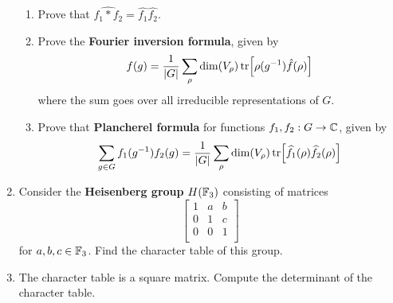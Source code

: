 \documentclass[../psets.tex]{subfiles}
\begin{document}
\begin{enumerate}
\begin{equation*}
    \end{equation*}
    \begin{enumerate}
        \item Prove that $\widehat{f_1*f_2}=\widehat{f_1}\widehat{f_2}$.
        \item Prove the \textbf{Fourier inversion formula}, given by
        \begin{equation*}
            f(g) = \frac{1}{|G|}\sum_\rho\dim(V_\rho)\tr[\rho(g^{-1})\hat{f}(\rho)]
        \end{equation*}
        where the sum goes over all irreducible representations of $G$.
        \item Prove that \textbf{Plancherel formula} for functions $f_1,f_2:G\to\mathbb{C}$, given by
        \begin{equation*}
            \sum_{g\in G}f_1(g^{-1})f_2(g) = \frac{1}{|G|}\sum_\rho\dim(V_\rho)\tr[\widehat{f_1}(\rho)\widehat{f_2}(\rho)]
        \end{equation*}
    \end{enumerate}
    \item Consider the \textbf{Heisenberg group} $H(\mathbb{F}_3)$ consisting of matrices
    \begin{equation*}
        \begin{bmatrix}
            1 & a & b\\
            0 & 1 & c\\
            0 & 0 & 1\\
        \end{bmatrix}
    \end{equation*}
    for $a,b,c\in\mathbb{F}_3$. Find the character table of this group.
    \item The character table is a square matrix. Compute the determinant of the character table.
\end{enumerate}
\end{document}
